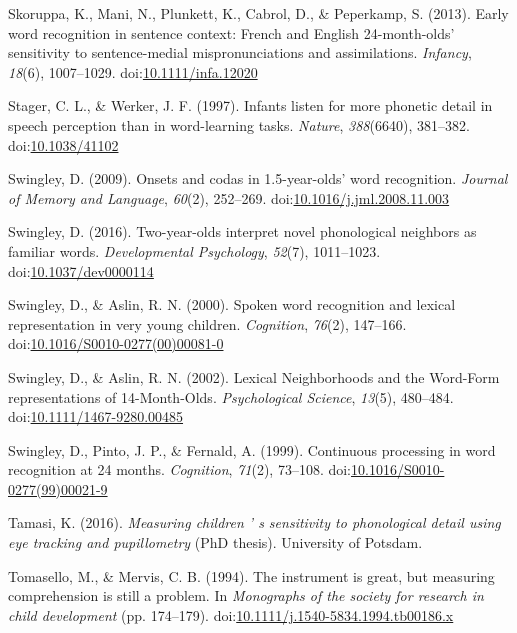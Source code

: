\documentclass[man]{apa6}
\begin{document}
\leavevmode\hypertarget{ref-Skoruppa2013}{}%
Skoruppa, K., Mani, N., Plunkett, K., Cabrol, D., \& Peperkamp, S. (2013). Early word recognition in sentence context: French and English 24-month-olds' sensitivity to sentence-medial mispronunciations and assimilations. \emph{Infancy}, \emph{18}(6), 1007--1029. doi:\href{https://doi.org/10.1111/infa.12020}{10.1111/infa.12020}

\leavevmode\hypertarget{ref-Stager1997}{}%
Stager, C. L., \& Werker, J. F. (1997). Infants listen for more phonetic detail in speech perception than in word-learning tasks. \emph{Nature}, \emph{388}(6640), 381--382. doi:\href{https://doi.org/10.1038/41102}{10.1038/41102}

\leavevmode\hypertarget{ref-Swingley2009}{}%
Swingley, D. (2009). Onsets and codas in 1.5-year-olds' word recognition. \emph{Journal of Memory and Language}, \emph{60}(2), 252--269. doi:\href{https://doi.org/10.1016/j.jml.2008.11.003}{10.1016/j.jml.2008.11.003}

\leavevmode\hypertarget{ref-Swingley2016}{}%
Swingley, D. (2016). Two-year-olds interpret novel phonological neighbors as familiar words. \emph{Developmental Psychology}, \emph{52}(7), 1011--1023. doi:\href{https://doi.org/10.1037/dev0000114}{10.1037/dev0000114}

\leavevmode\hypertarget{ref-Swingley2000}{}%
Swingley, D., \& Aslin, R. N. (2000). Spoken word recognition and lexical representation in very young children. \emph{Cognition}, \emph{76}(2), 147--166. doi:\href{https://doi.org/10.1016/S0010-0277(00)00081-0}{10.1016/S0010-0277(00)00081-0}

\leavevmode\hypertarget{ref-Swingley2002}{}%
Swingley, D., \& Aslin, R. N. (2002). Lexical Neighborhoods and the Word-Form representations of 14-Month-Olds. \emph{Psychological Science}, \emph{13}(5), 480--484. doi:\href{https://doi.org/10.1111/1467-9280.00485}{10.1111/1467-9280.00485}

\leavevmode\hypertarget{ref-Swingley1999}{}%
Swingley, D., Pinto, J. P., \& Fernald, A. (1999). Continuous processing in word recognition at 24 months. \emph{Cognition}, \emph{71}(2), 73--108. doi:\href{https://doi.org/10.1016/S0010-0277(99)00021-9}{10.1016/S0010-0277(99)00021-9}

\leavevmode\hypertarget{ref-Tamasi2016}{}%
Tamasi, K. (2016). \emph{Measuring children ' s sensitivity to phonological detail using eye tracking and pupillometry} (PhD thesis). University of Potsdam.

\leavevmode\hypertarget{ref-Tomasello1994}{}%
Tomasello, M., \& Mervis, C. B. (1994). The instrument is great, but measuring comprehension is still a problem. In \emph{Monographs of the society for research in child development} (pp. 174--179). doi:\href{https://doi.org/10.1111/j.1540-5834.1994.tb00186.x}{10.1111/j.1540-5834.1994.tb00186.x}
\end{document}
